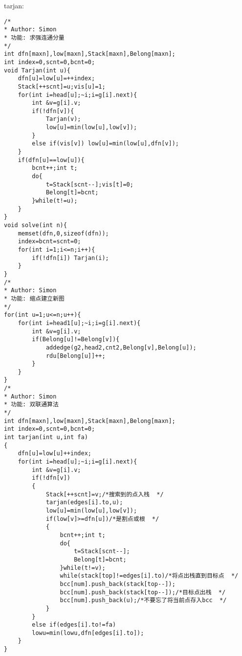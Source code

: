 tarjan:
\begin{lstlisting}
/*
* Author: Simon
* 功能: 求强连通分量
*/
int dfn[maxn],low[maxn],Stack[maxn],Belong[maxn];
int index=0,scnt=0,bcnt=0;
void Tarjan(int u){
	dfn[u]=low[u]=++index;
	Stack[++scnt]=u;vis[u]=1;
	for(int i=head[u];~i;i=g[i].next){
		int &v=g[i].v;
		if(!dfn[v]){
			Tarjan(v);
			low[u]=min(low[u],low[v]);
		}
		else if(vis[v]) low[u]=min(low[u],dfn[v]);
	}
	if(dfn[u]==low[u]){
		bcnt++;int t;
		do{
			t=Stack[scnt--];vis[t]=0;
			Belong[t]=bcnt;
		}while(t!=u);
	}
}
void solve(int n){
	memset(dfn,0,sizeof(dfn));
	index=bcnt=scnt=0;
	for(int i=1;i<=n;i++){
		if(!dfn[i]) Tarjan(i);
	}
}
/*
* Author: Simon
* 功能: 缩点建立新图
*/
for(int u=1;u<=n;u++){
	for(int i=head1[u];~i;i=g[i].next){
		int &v=g[i].v;
		if(Belong[u]!=Belong[v]){
			addedge(g2,head2,cnt2,Belong[v],Belong[u]);
			rdu[Belong[u]]++;
		}
	}
}
/*
* Author: Simon
* 功能: 双联通算法
*/
int dfn[maxn],low[maxn],Stack[maxn],Belong[maxn];
int index=0,scnt=0,bcnt=0; 
int tarjan(int u,int fa)
{
	dfn[u]=low[u]++index;
	for(int i=head[u];~i;i=g[i].next){
		int &v=g[i].v;
		if(!dfn[v])
		{
			Stack[++scnt]=v;/*搜索到的点入栈  */
			tarjan(edges[i].to,u);
			low[u]=min(low[u],low[v]);
			if(low[v]>=dfn[u])/*是割点或根  */
			{
				bcnt++;int t;
				do{
					t=Stack[scnt--];
					Belong[t]=bcnt;
				}while(t!=v);
				while(stack[top]!=edges[i].to)/*将点出栈直到目标点  */
				bcc[num].push_back(stack[top--]);
				bcc[num].push_back(stack[top--]);/*目标点出栈  */
				bcc[num].push_back(u);/*不要忘了将当前点存入bcc  */
			}
		}
		else if(edges[i].to!=fa)
		lowu=min(lowu,dfn[edges[i].to]);
	}
}
\end{lstlisting}
